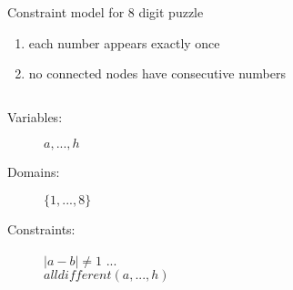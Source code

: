 \begin{frame}[plain]{Constraint model for 8 digit puzzle}
\begin{enumerate}
\item each number appears exactly once
\item no connected nodes have consecutive numbers
\end{enumerate}

\begin{columns}
\begin{column}{0.4\textwidth}
\begin{description}
\item[Variables:] $a, ..., h$
\item[Domains:] $\{1,..., 8\}$ 
\item[Constraints:] 
$| a - b | \neq 1$ ...\\
$alldifferent(a,...,h)$ 
\end{description}
\end{column}

\begin{column}{0.6\textwidth}

\end{column}
\end{columns}
\end{frame}



